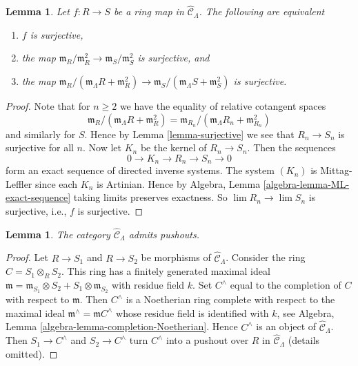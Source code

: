 \documentclass{stacks-project}
\theoremstyle{plain}
\newtheorem{lemma}[subsection]{Lemma}
\theoremstyle{definition}
\theoremstyle{remark}
\numberwithin{equation}{subsection}
\def\lim{\mathop{\mathrm{lim}}\nolimits}
\begin{document}
\begin{lemma}
\label{lemma-surjective-cotangent-space}
Let $f: R \to S$ be a ring map in $\widehat{\mathcal{C}}_\Lambda$.
The following are equivalent
\begin{enumerate}
\item $f$ is surjective,
\item the map
$\mathfrak m_R/\mathfrak m_R^2 \to \mathfrak m_S/\mathfrak m_S^2$
is surjective, and
\item the map
$\mathfrak m_R/(\mathfrak m_\Lambda R + \mathfrak m_R^2) \to
\mathfrak m_S/(\mathfrak m_\Lambda S + \mathfrak m_S^2)$
is surjective.
\end{enumerate}
\end{lemma}

\begin{proof}
Note that for $n \geq 2$ we have the equality of relative cotangent spaces
$$
\mathfrak m_R/(\mathfrak m_\Lambda R + \mathfrak m_R^2)
=
\mathfrak m_{R_n}/(\mathfrak m_\Lambda R_n + \mathfrak m_{R_n}^2)
$$
and similarly for $S$. Hence by
Lemma \ref{lemma-surjective}
we see that $R_n \to S_n$ is surjective for all $n$.
Now let $K_n$ be the kernel of $R_n \to S_n$.  Then the sequences
$$
0 \to K_n \to R_n \to S_n \to 0
$$
form an exact sequence of directed inverse systems. The system $(K_n)$ is
Mittag-Leffler since each $K_n$ is Artinian. Hence by
Algebra, Lemma \ref{algebra-lemma-ML-exact-sequence}
taking limits preserves exactness. So
$\lim R_n \to \lim S_n$ is surjective, i.e., $f$ is surjective.
\end{proof}

\begin{lemma}
\label{lemma-CLambdahat-pushouts}
The category $\widehat{\mathcal{C}}_\Lambda$ admits pushouts.
\end{lemma}

\begin{proof}
Let $R \to S_1$ and $R \to S_2$ be morphisms of
$\widehat{\mathcal{C}}_\Lambda$. Consider the ring
$C = S_1 \otimes_R S_2$.
This ring has a finitely generated maximal ideal
$\mathfrak m = \mathfrak m_{S_1} \otimes S_2 +
S_1 \otimes \mathfrak m_{S_2}$ with residue field $k$.
Set $C^\wedge$ equal to the completion of $C$ with respect to $\mathfrak m$.
Then $C^\wedge$ is a Noetherian ring complete with respect to
the maximal ideal $\mathfrak m^\wedge = \mathfrak mC^\wedge$
whose residue field is identified with $k$, see
Algebra, Lemma \ref{algebra-lemma-completion-Noetherian}.
Hence $C^\wedge$ is an object of $\widehat{\mathcal{C}}_\Lambda$.
Then $S_1 \to C^\wedge$ and $S_2 \to C^\wedge$ turn $C^\wedge$
into a pushout over $R$ in $\widehat{\mathcal{C}}_\Lambda$ (details omitted).
\end{proof}
\end{document}
